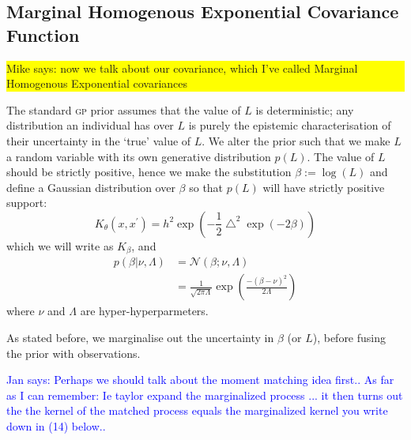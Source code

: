 \documentclass{article}
\newcommand\jansays[1]{\textcolor{blue}{Jan says: #1}}
\newcommand\mikesays[1]{\colorbox{yellow}{\parbox{\columnwidth}{Mike says: #1}}}
\begin{document}
\subsection{Marginal Homogenous Exponential Covariance Function} \mikesays{now we talk about our covariance, which I've called Marginal Homogenous Exponential covariances}


The standard {\scshape gp} prior assumes that the value of $L$ is deterministic; any distribution an individual has over $L$ is purely the epistemic characterisation of their uncertainty in the `true' value of $L$. We alter the prior such that we make $L$ a random variable with its own generative distribution $p(L)$. The value of $L$ should be strictly positive, %
hence we make the substitution $\beta := \log(L)$ and define a Gaussian distribution over $\beta$ so that $p(L)$ will have strictly positive support: 
\begin{equation}\label{betaSEkernel}
K_\theta(x,x^\prime) = h^2 \exp \left( -\frac{1}{2}\bigtriangleup^2 \exp(-2\beta) \right)
\end{equation}
which we will write as $K_\beta$, and
\begin{align}
p(\beta|\nu,\Lambda) &= \mathcal{N}(\beta; \nu, \Lambda) \nonumber\\
&= \frac{1}{\sqrt{2 \pi \Lambda}} \exp \left( \frac{ -(\beta - \nu)^2}{2\Lambda} \right) \label{betapdf}
\end{align}
where $\nu$ and $\Lambda$ are hyper-hyperparmeters.

As stated before, we marginalise out the uncertainty in $\beta$ (or $L$), before fusing the prior with observations. 

\jansays{Perhaps we should talk about the moment matching idea first.. As far as I can remember: Ie taylor expand the marginalized process ... it then turns out the the kernel of the matched process equals the marginalized kernel you write down in (14) below..}
\end{document}
